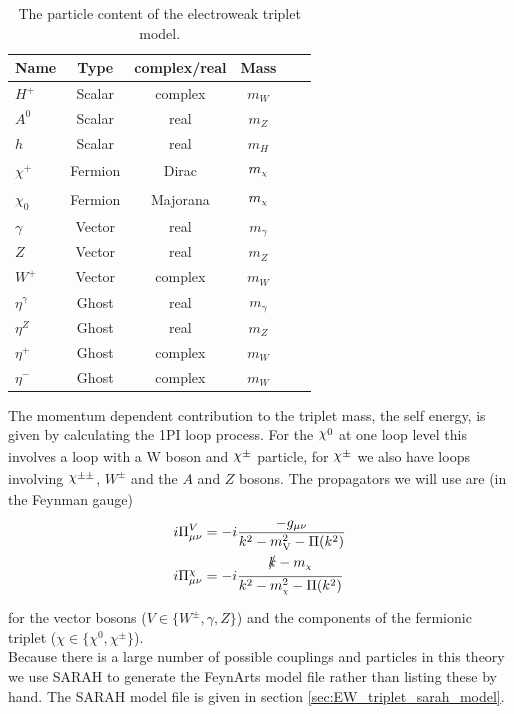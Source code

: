 \documentclass[11pt]{article}
\newcommand{\mychi}{\raisebox{0pt}[1ex][1ex]{\tiny$\chi$}}
\newcommand{\chiinline}{\raisebox{1.7pt}[1ex][1ex]{$\chi$}}
\def\mc{m_{\mychi}}
\newcommand{\sarah}{\textsf{SARAH} }
\newcommand{\feynarts}{\textsf{FeynArts} }
\begin{document}
\begin{table}[h]
 \caption{The particle content of the electroweak triplet model.}\label{tab:particles}
 \vspace{0.3cm}
 \centering 
\begin{tabular}{lccccc}
\hline 
Name & Type & complex/real & Mass  \\ 
\hline \hline 
\(H^+\) & Scalar &complex& $m_W$\\
 \(A^0\) & Scalar &real & $m_Z$\\
 \(h\) & Scalar &real & $m_H$\\
 \hline 
\(\chi^{+}\) & Fermion &Dirac & $\mc$\\
 \(\chi_0\) & Fermion &Majorana & $\mc$\\
 \hline 
\(\gamma\) & Vector &real & $m_{\gamma}$\\
 \(Z\) & Vector &real & $m_Z$\\
 \(W^+\) & Vector &complex & $m_W$\\
 \(\eta^{\gamma}\) & Ghost &real & $m_{\gamma}$\\
 \(\eta^Z\) & Ghost &real & $m_Z$\\
 \(\eta^+\) & Ghost &complex & $m_W$\\
 \(\eta^-\) & Ghost &complex & $m_W$\\
 \hline
\end{tabular}
 \end{table}
The momentum dependent contribution to the triplet mass, the self energy, is given by calculating the 1PI loop process.  For the $
\chiinline^0$ at one loop level this involves a loop with a W boson and $\chiinline^{\pm}$ particle, for $\chiinline^{\pm}$ we also have loops involving $
\chiinline^{\pm\pm}$, $W^{\pm}$ and the $A$ and $Z$ bosons.  The propagators we will use are (in the Feynman gauge)
\begin{align}
i\Pi^{V}_{\mu\nu}&=-i\frac{-g_{\mu\nu}}{k^2-m_{\text{V}}^2- \Pi(k^2)}\label{eqn:gauge_boson_propagator}\\ 
i\Pi^{\chi}_{\mu\nu}&=-i\frac{\slashed{k}-\mc}{k^2-\mc^2- \Pi(k^2)}
\end{align}
for the vector bosons ($V\in\{W^{\pm},\gamma,Z\}$) and the components of the fermionic triplet ($\chi\in\{\chi^0,\chi^{\pm}\}$).\\

Because there is a large number of possible couplings and particles in this theory we use \sarah \cite{Staub2014} to generate the \feynarts \cite{Hahn2000} model file rather than listing these by hand.  The \sarah model file is given in section \ref{sec:EW_triplet_sarah_model}.\\
\end{document}
